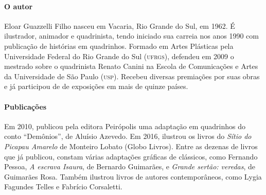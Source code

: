 \documentclass[11pt]{extarticle}
\begin{document}

\paragraph{O autor} Eloar Guazzelli Filho nasceu em Vacaria, Rio Grande do Sul, em 1962. É ilustrador, animador e quadrinista, tendo iniciado sua carreia nos anos 1990 com  publicação de histórias em quadrinhos.
Formado em Artes Plásticas pela Universidade Federal do Rio Grande do Sul (\textsc{ufrgs}), defendeu em 2009 o mestrado sobre o quadrinista Renato Canini na Escola de Comunicações e Artes da Universidade de São Paulo (\textsc{usp}). Recebeu diversas premiações por suas obras e já participou de de exposições em mais de quinze países.


\paragraph{Publicações} Em 2010, publicou pela editora Peirópolis uma adaptação em quadrinhos do conto ``Demônios'', de Aluísio Azevedo. Em 2016, ilustrou os livros do \textit{Sítio do Picapau Amarelo} de Monteiro Lobato (Globo Livros). Entre as dezenas de livros que já publicou, constam várias adaptações gráficas de clássicos, como Fernando Pessoa, \textit{A escrava Isaura}, de Bernardo Guimarães, e \textit{Grande sertão: veredas}, de Guimarães Rosa. Também ilustrou livros de autores contemporâneos, como Lygia Fagundes Telles e Fabrício Corsaletti.
\end{document}
